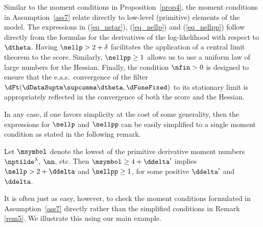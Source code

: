 Similar to the moment conditions in Proposition~\ref{prop4}, the moment
conditions in Assumption~\ref{ass7} relate directly to low-level (primitive) elements of the model. The expressions in (\ref{eq_nstar}),  (\ref{eq_nellp}) and (\ref{eq_nellpp}) follow directly from the formulas for the derivatives of the 
log-likelihood with respect to $\dtheta$. 
Having $\nellp > 2+\delta$ facilitates the application of a central limit theorem to the score. Similarly, $\nellpp\geq 1$ allows us to use a uniform law of large numbers for the Hessian. Finally, the condition $\nfin>0$ is designed to ensure that the e.a.s.\ convergence of the filter $\dFt(\dDataSuptm\supcomma\dtheta,\dFoneFixed)$ to its stationary limit is appropriately reflected in the convergence of both the score and the Hessian.

In any case, if one favors simplicity at the cost of some generality, then  the expressions for $\nellp$ and $\nellpp$ can be easily simplified to a single moment condition as stated in the following remark.

\begin{rem} \rm
\label{rem5}
Let $\msymbol$ denote the lowest of the primitive derivative moment numbers $\nptilde^{\lambda}$, $\nn$,  etc. Then $\msymbol \geq 4+\ddelta'$ implies $\nellp> 2+\ddelta$ and $\nellpp \geq 1$, for some positive $\ddelta'$ and $\ddelta$.
\end{rem}

\noindent It is often just as easy, however, to check the moment conditions formulated in Assumption~\ref{ass7} 
directly rather than the simplified conditions in Remark \ref{rem5}. We illustrate this using our main example.

